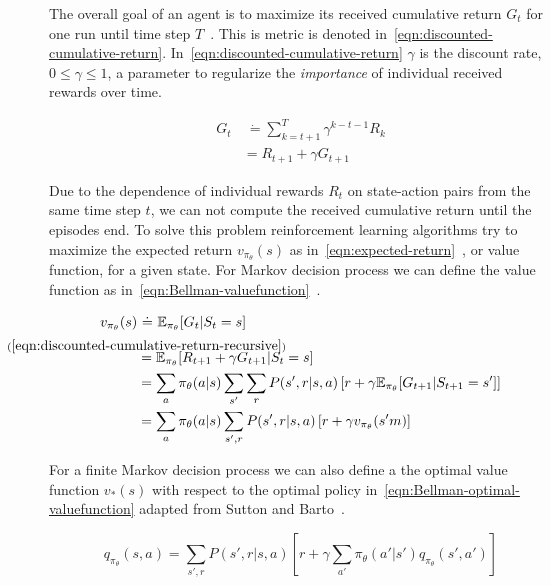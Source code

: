 The overall goal of an agent is to maximize its received cumulative return $G_t$ for one run until time step $T$~\cite{SuttonBartoRLBook}. This is metric is denoted in~\eqref{eqn:discounted-cumulative-return}. In~\eqref{eqn:discounted-cumulative-return} $\gamma$ is the discount rate, $0 \leq \gamma \leq 1$, a parameter to regularize the \textit{importance} of individual received rewards over time. 

\begin{align}
	G_t & \ \dot{=} \sum_{k=t+1}^T \gamma^{k-t-1}R_k \label{eqn:discounted-cumulative-return} \\
	&= R_{t+1} + \gamma G_{t+1} \label{eqn:discounted-cumulative-return-recursive}
\end{align}

Due to the dependence of individual rewards $R_t$ on state-action pairs from the same time step $t$, we can not compute the received cumulative return until the episodes end. To solve this problem reinforcement learning algorithms try to maximize the expected return $v_{\pi_\theta}(s)$ as in~\eqref{eqn:expected-return}~\cite{SuttonBartoRLBook}, or value function, for a given state. For Markov decision process we can define the value function as in~\eqref{eqn:Bellman-valuefunction}~\cite{SuttonBartoRLBook}. 

\begin{align}
	v_{\pi_\theta}(s) & \ \dot{=} \ \mathbb{E}_{\pi_\theta}[G_t | S_t = s] \label{eqn:expected-return} \\
	&\overset{\mathclap{\strut(\ref{eqn:discounted-cumulative-return-recursive})}}{=} \mathbb{E}_{\pi_\theta}[R_{t+1} + \gamma G_{t+1}| S_t = s] \nonumber \\
	& = \sum_a \pi_\theta(a|s) \sum_{s'} \sum_r P(s', r| s, a)\left[r + \gamma \mathbb{E}_{\pi_\theta}[G_{t+1} | S_{t+1} = s']\right] \nonumber \\
	& = \sum_a \pi_\theta(a|s) \sum_{s', r} P(s', r| s, a)\left[r + \gamma v_{\pi_\theta}(s'm)\right] \label{eqn:Bellman-valuefunction}
\end{align}

For a finite Markov decision process we can also define a the optimal value function $v_*(s)$ with respect to the optimal policy in~\eqref{eqn:Bellman-optimal-valuefunction} adapted from Sutton and Barto~\cite{SuttonBartoRLBook}.

\begin{equation}\label{eqn:Bellman-action-valuefunction}
	q_{\pi_\theta}(s, a) = \sum_{s', r} P(s', r |s, a) \left[r + \gamma \sum_{a'} \pi_\theta(a'| s')q_{\pi_\theta}(s', a')\right]
\end{equation}

